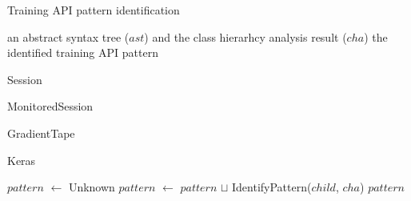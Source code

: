 \begin{algorithm}
  \caption{Training API pattern identification}\label{al:apiident}
  \begin{algorithmic}[1]
    \Require an abstract syntax tree ($ast$) and the class hierarhcy analysis result ($cha$)
    \Ensure the identified training API pattern

      \label{alg:begin-match-session}
          Session
        \EndIf
      \Endcase\label{alg:end-match-session}

      \label{alg:begin-match-monitoredsession}
          MonitoredSession
        \EndIf
      \Endcase\label{alg:end-match-monitoredsession}

      \label{alg:begin-match-gradient}
        \label{alg:mid-match-gradient}
          GradientTape
        \EndIf
      \EndCase\label{alg:end-match-gradient}

      \label{alg:begin-match-keras}
          Keras
        \EndIf
      \Endcase\label{alg:end-match-keras}
    \Endmatch

    \State $pattern$ $\leftarrow$ Unknown\label{alg:begin-ow}
      \State $pattern$ $\leftarrow$ $pattern$ $\sqcup$ {\sc IdentifyPattern($child$, $cha$)}
    \Endforeach
    \State $pattern$\label{alg:end-ow}
    \EndFunction
  \end{algorithmic}
\end{algorithm}

